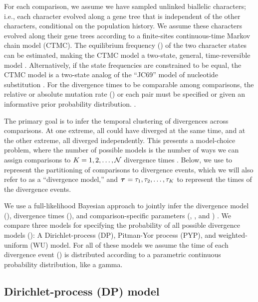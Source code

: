 \documentclass[letterpaper,12pt]{article}
\begin{document}
For each comparison, we assume we have sampled unlinked biallelic characters;
i.e., each character evolved along a gene tree that is independent of the
other characters, conditional on the population history.
We assume these characters evolved along their gene trees according to a
finite-sites continuous-time Markov chain model (CTMC).
The equilibrium frequency (\gfreq) of the two character states can be
estimated, making the CTMC model a two-state, general, time-reversible model
\citep{Tavare1986}.
Alternatively, if the state frequencies are constrained to be equal, the CTMC
model is a two-state analog of the ``JC69'' model of nucleotide substitution
\citep{JC1969}.
For the divergence times to be comparable among comparisons, the relative or
absolute mutation rate (\murate) or each pair must be specified or given an
informative prior probability distribution.
\citep{Oaks2018ecoevolity,Oaks2019codemog}.

The primary goal is to infer the temporal clustering of divergences across
\ncomparisons comparisons.
At one extreme, all \ncomparisons could have diverged at the same time,
and at the other extreme, all \ncomparisons diverged independently.
This presents a model-choice problem, where the number of possible models
is the number of ways we can assign \ncomparisons comparisons to
$\nevents = 1, 2,  \ldots, \ncomparisons$ divergence times
\citep[the Bell number;][]{Bell1934}.
Below, we use \etimesets to represent the partitioning of comparisons to
divergence events, which we will also refer to as a ``divergence model,'' and
$\etimes = \etime[1], \etime[2], \ldots, \etime[\nevents]$
to represent the times of the \nevents divergence events.

We use a full-likelihood Bayesian approach to jointly infer
the divergence model (\etimesets), divergence times
(\etimes),
and comparison-specific parameters (\epopsize, \murate, and \gfreq)
\citep{Oaks2018ecoevolity,Oaks2019codemog}.
We compare three models for specifying the probability of all
possible divergence models (\etimesets):
A Dirichlet-process (DP), Pitman-Yor process (PYP), and
weighted-uniform (WU) model.
For all of these models we assume the time of each divergence event (\etime) is
distributed according to a parametric continuous probability distribution, like
a gamma.

\subsection{Dirichlet-process (DP) model}
\end{document}
